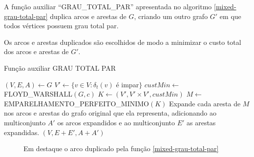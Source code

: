     A função auxiliar ``GRAU\_TOTAL\_PAR'' apresentada no algoritmo \ref{mixed-grau-total-par} duplica arcos e arestas de $G$, criando um outro grafo $G'$ em que todos vértices possuem grau total par.

    Os arcos e arestas duplicados são escolhidos de modo a minimizar o custo total dos arcos e arestas de $G'$.
    
    \begin{algorithm}
    \caption{Função auxiliar GRAU TOTAL PAR}
    \label{mixed-grau-total-par}
    \begin{algorithmic}[1]
        \State $(V, E, A) \gets G$
        \State $V' \gets \{v \in V : \delta_t(v)$ é impar$\}$
        \State $custMin \gets $ FLOYD\_WARSHALL$(G, c)$ 
        \State $K \gets (V', V' \times V', custMin)$ 
        \State $M \gets $ EMPARELHAMENTO\_PERFEITO\_MINIMO$(K)$
        \State Expande cada aresta de $M$ nos arcos e arestas do grafo original que ela representa, adicionando ao multiconjunto $A'$ os arcos expandidos e ao multiconjunto $E'$ as arestas expandidas.
        \State \Return $(V, E + E', A + A')$ 
    \EndFunction
    \end{algorithmic}
    \end{algorithm}

    \begin{figure}[H]
        \centering
        \caption{Em destaque o arco duplicado pela função \ref{mixed-grau-total-par}}
        \label{mixed-exemplo-grau-total}
    \end{figure}

